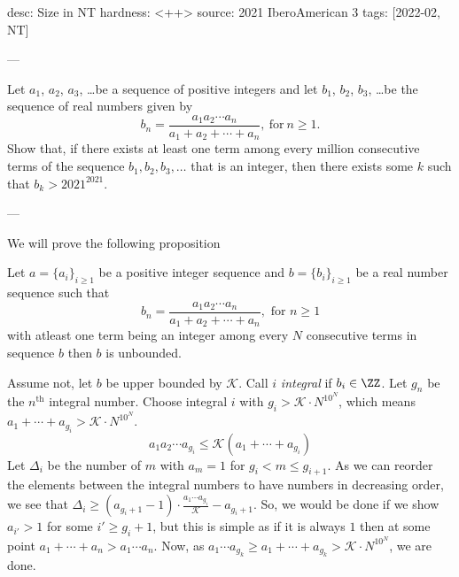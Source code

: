 desc: Size in NT
hardness: <++>
source: 2021 IberoAmerican 3
tags: [2022-02, NT]

---

Let $a_1$, $a_2$, $a_3$, \ldots be a sequence of positive integers and let $b_1$, $b_2$, $b_3$, \dots be the sequence of real numbers given by \[ b_n = \dfrac{a_1a_2\cdots a_n}{a_1+a_2+\cdots + a_n},
\ \mbox{for}\ n\geq 1. \]
Show that, if there exists at least one term among every million consecutive terms of the sequence $b_1,b_2,b_3,\ldots$ that is an integer, then there exists some $k$ such that $b_k > 2021^{2021}$.

---

\renewcommand{\cal}{\mathcal}
We will prove the following proposition
\begin{proposition*}
  Let $a = \{a_i\}_{i \geq 1}$ be a positive integer sequence and $b = \{b_i\}_{i \geq 1}$ be a real number sequence such that
  \[b_n = \frac{a_1a_2\cdots a_n}{a_1 + a_2 + \cdots + a_n}, \text{ for } n \geq 1
  \]
  with atleast one term being an integer among every $N$ consecutive terms in sequence $b$ then $b$ is unbounded.
\end{proposition*}
  Assume not, let $b$ be upper bounded by $\cal{K}$. Call $i$ \textit{integral} if $b_i \in \ZZ$. Let $g_n$ be the $n^{\text{th}}$ integral number. Choose integral $i$ 
  with $g_i > \cal{K}\cdot N^{10^N}$, which means $a_1 + \cdots + a_{g_i} > \cal{K} \cdot N^{10^N}$.
  \[a_1 a_2 \cdots a_{g_i} \leq \cal{K} (a_1 + \cdots + a_{g_i})\]
  Let $\Delta_i$ be the number of $m$ with $a_m = 1$ for $g_{i} < m \leq g_{i+1}$. As we can reorder the elements between the integral numbers to have numbers
  in decreasing order, we see that $\Delta_i \geq (a_{g_{i}+1} - 1) \cdot \frac{a_1 \cdots a_{g_i}}{\cal{K}} - a_{g_i + 1}$. So, we would be done if we show
  $a_{i'} > 1$ for some $i' \geq g_i+1$, but this is simple as if it is always $1$ then at some point $a_1 + \cdots + a_n > a_1 \cdots a_n$. Now, as $a_1 \cdots a_{g_k} \geq a_1 + \cdots + a_{g_k} > \cal{K} \cdot N^{10^N}$,
  we are done.
